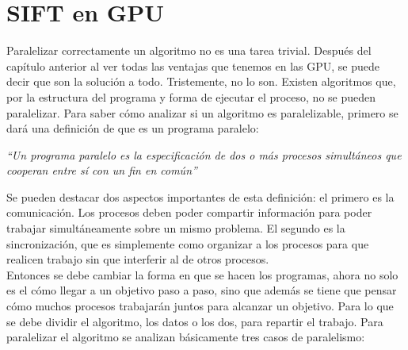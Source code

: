 \chapter{ SIFT en GPU}
Paralelizar correctamente un algoritmo no es una tarea trivial. Después del capítulo anterior al ver todas las ventajas que tenemos en las GPU, se puede decir que son la solución a todo. Tristemente, no lo son. Existen algoritmos que, por la estructura del programa y forma de ejecutar el proceso, no se pueden paralelizar. Para saber cómo analizar si un algoritmo es paralelizable, primero se dará una definición de que es un programa paralelo:
\begin{center}
\textit{“Un programa paralelo es la especificación de dos o más procesos simultáneos que cooperan entre sí con un fin en común” \cite{concurrente}}
\end{center}
Se pueden destacar dos aspectos importantes de esta definición: el primero es la comunicación. Los procesos deben poder compartir información  para poder trabajar simultáneamente sobre un mismo problema. El segundo es la sincronización, que es simplemente como organizar a los procesos para que realicen trabajo sin que interferir al de otros procesos.\\
Entonces se debe cambiar la forma en que se hacen los programas, ahora no solo es el cómo llegar a un objetivo paso a paso, sino que además se tiene que pensar cómo muchos procesos trabajarán juntos para alcanzar un objetivo. Para lo que se debe dividir el algoritmo, los datos o los dos, para repartir el trabajo. Para paralelizar el algoritmo se analizan básicamente tres casos de paralelismo:\\\\
